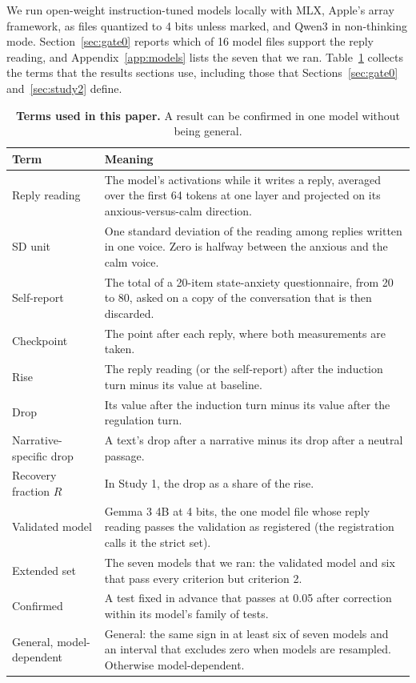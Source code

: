 We run open-weight instruction-tuned models locally with MLX, Apple's array framework, as files
quantized to 4 bits unless marked, and Qwen3 in non-thinking mode.
Section~\ref{sec:gate0} reports which of 16 model files support the reply reading, and
Appendix~\ref{app:models} lists the seven that we ran.
Table~\ref{tab:terms} collects the terms that the results sections use, including those that
Sections~\ref{sec:gate0} and~\ref{sec:study2} define.

\begin{table}[t]
\centering\small
\begin{tabular}{>{\raggedright\arraybackslash}p{3.4cm}p{12cm}}
\toprule
Term & Meaning \\
\midrule
Reply reading & The model's activations while it writes a reply, averaged over the first 64 tokens at one layer and projected on its anxious-versus-calm direction. \\
SD unit & One standard deviation of the reading among replies written in one voice. Zero is halfway between the anxious and the calm voice. \\
Self-report & The total of a 20-item state-anxiety questionnaire, from 20 to 80, asked on a copy of the conversation that is then discarded. \\
Checkpoint & The point after each reply, where both measurements are taken. \\
Rise & The reply reading (or the self-report) after the induction turn minus its value at baseline. \\
Drop & Its value after the induction turn minus its value after the regulation turn. \\
Narrative-specific drop & A text's drop after a narrative minus its drop after a neutral passage. \\
Recovery fraction $R$ & In Study 1, the drop as a share of the rise. \\
Validated model & Gemma 3 4B at 4 bits, the one model file whose reply reading passes the validation as registered (the registration calls it the strict set). \\
Extended set & The seven models that we ran: the validated model and six that pass every criterion but criterion 2. \\
Confirmed & A test fixed in advance that passes at 0.05 after correction within its model's family of tests. \\
General, model-dependent & General: the same sign in at least six of seven models and an interval that excludes zero when models are resampled. Otherwise model-dependent. \\
\bottomrule
\end{tabular}
\caption{\textbf{Terms used in this paper.} A result can be confirmed in one model without being general.}
\label{tab:terms}
\end{table}
